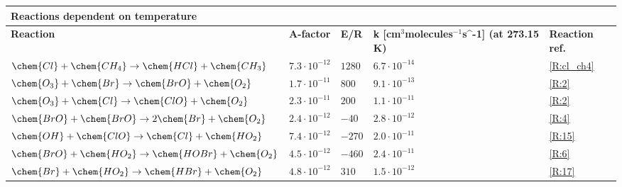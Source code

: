 \begin{table}[]
\begin{tabular}{|lllll|}
\hline
\multicolumn{5}{|l|}{\textbf{Reactions dependent on temperature}}                                                                                                                                                                                         \\ \hline
\multicolumn{1}{|l|}{\textbf{Reaction}}                              & \multicolumn{1}{l|}{\textbf{A-factor}} & \multicolumn{1}{l|}{\textbf{E/R}} & \multicolumn{1}{l|}{\textbf{k [cm$^3$molecules$^{-1}$s^{-1}] (at 273.15 K)}} & \textbf{Reaction ref.} \\ \hline
$\chem{Cl} + \chem{CH_4} \rightarrow \chem{HCl} + \chem{CH_3} $      & $7.3\cdot10^{-12}$                     & $1280$                            & $6.7\cdot10^{-14}$                                                           & \ref{R:cl_ch4}         \\
$\chem{O_3} + \chem{Br} \rightarrow \chem{BrO} + \chem{O_2}$         & $1.7\cdot10^{-11}$                     & $800$                             & $9.1\cdot10^{-13}$                                                           & \ref{R:2}              \\
$\chem{O_3} + \chem{Cl} \rightarrow \chem{ClO} + \chem{O_2}$         & $2.3\cdot10^{-11}$                     & $200$                             & $1.1\cdot10^{-11}$                                                           & \ref{R:2}              \\
$\chem{BrO} + \chem{BrO} \rightarrow 2\chem{Br} + \chem{O_2}$        & $2.4\cdot10^{-12}$                     & $-40$                             & $2.8\cdot10^{-12}$                                                           & \ref{R:4}              \\
$\chem{OH} + \chem{ClO} \rightarrow \chem{Cl} + \chem{HO_2}$         & $7.4\cdot10^{-12}$                     & $-270$                            & $2.0\cdot10^{-11}$                                                           & \ref{R:15}             \\
$\chem{BrO} + \chem{HO_2} \rightarrow \chem{HOBr} + \chem{O_2}$      & $4.5\cdot10^{-12}$                     & $-460$                            & $2.4\cdot10^{-11}$                                                           & \ref{R:6}              \\
$\chem{Br} + \chem{HO_2} \rightarrow \chem{HBr} + \chem{O_2}$        & $4.8\cdot10^{-12}$                     & $310$                             & $1.5\cdot10^{-12}$                                                           & \ref{R:17}             \\

\end{tabular}
\end{table}
